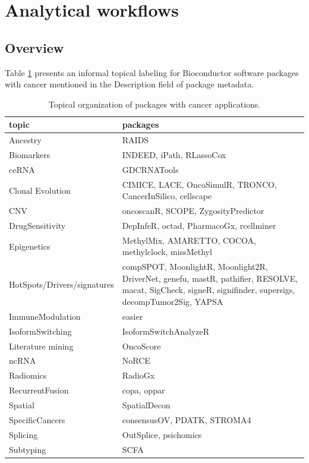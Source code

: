 
\section{Analytical workflows}\label{analytical-workflows}


\subsection{Overview}\label{overview}

Table \ref{tab:tab-wflow} presents an informal topical
labeling for Bioconductor software packages with
cancer mentioned in the Description field of package
metadata.

\begin{table}
\caption{\label{tab:tab-wflow}Topical organization of packages with cancer applications.}
\begin{tabular}{lp{6cm}}
\toprule
topic & packages\\
\midrule
Ancestry & RAIDS\\
Biomarkers & INDEED, iPath, RLassoCox\\
ceRNA & GDCRNATools\\
Clonal Evolution & CIMICE, LACE, OncoSimulR, TRONCO, CancerInSilico, cellscape\\
CNV & oncoscanR, SCOPE, ZygosityPredictor\\
\addlinespace
DrugSensitivity & DepInfeR, octad, PharmacoGx, rcellminer\\
Epigenetics & MethylMix, AMARETTO, COCOA, methylclock, missMethyl\\
HotSpots/Drivers/signatures & compSPOT, MoonlightR, Moonlight2R, DriverNet, genefu, mastR, pathifier, RESOLVE, macat, SigCheck, signeR, signifinder, supersigs, decompTumor2Sig, YAPSA\\
ImmuneModulation & easier\\
IsoformSwitching & IsoformSwitchAnalyzeR\\
\addlinespace
Literature mining & OncoScore\\
ncRNA & NoRCE\\
Radiomics & RadioGx\\
RecurrentFusion & copa, oppar\\
Spatial & SpatialDecon\\
\addlinespace
SpecificCancers & consensusOV, PDATK, STROMA4\\
Splicing & OutSplice, psichomics\\
Subtyping & SCFA\\
\end{tabular}
\bottomrule
\end{table}

